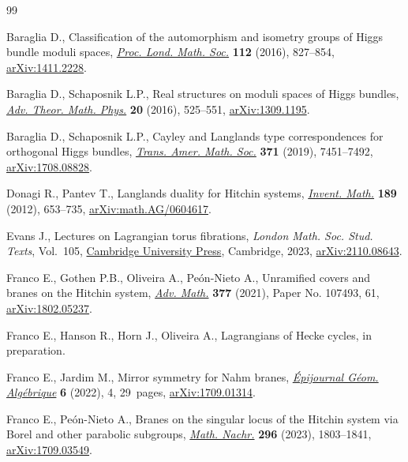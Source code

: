 \documentclass[pdftex]{sigma}
\numberwithin{equation}{section}
\theoremstyle{definition}
\begin{document}
\begin{thebibliography}{99}
\footnotesize\itemsep=0pt

Baraglia D., Classification of the automorphism and isometry groups of {H}iggs
 bundle moduli spaces,
 \href{https://doi.org/10.1112/plms/pdw014}{\textit{Proc. Lond. Math. Soc.}}
 \textbf{112} (2016), 827--854,
 \href{http://arxiv.org/abs/1411.2228}{arXiv:1411.2228}.

Baraglia D., Schaposnik L.P., Real structures on moduli spaces of {H}iggs
 bundles, \href{https://doi.org/10.4310/ATMP.2016.v20.n3.a2}{\textit{Adv.
 Theor. Math. Phys.}} \textbf{20} (2016), 525--551,
 \href{http://arxiv.org/abs/1309.1195}{arXiv:1309.1195}.

Baraglia D., Schaposnik L.P., Cayley and {L}anglands type correspondences for
 orthogonal {H}iggs bundles,
 \href{https://doi.org/10.1090/tran/7587}{\textit{Trans. Amer. Math. Soc.}}
 \textbf{371} (2019), 7451--7492,
 \href{http://arxiv.org/abs/1708.08828}{arXiv:1708.08828}.

Donagi R., Pantev T., Langlands duality for {H}itchin systems,
 \href{https://doi.org/10.1007/s00222-012-0373-8}{\textit{Invent. Math.}}
 \textbf{189} (2012), 653--735,
 \href{http://arxiv.org/abs/math.AG/0604617}{arXiv:math.AG/0604617}.

Evans J., Lectures on {L}agrangian torus fibrations, \textit{London Math. Soc.
 Stud. Texts}, Vol.~105,
 \href{https://doi.org/10.1017/9781009372671}{Cambridge University Press},
 Cambridge, 2023, \href{http://arxiv.org/abs/2110.08643}{arXiv:2110.08643}.

Franco E., Gothen P.B., Oliveira A., Pe\'{o}n-Nieto A., Unramified covers and
 branes on the {H}itchin system,
 \href{https://doi.org/10.1016/j.aim.2020.107493}{\textit{Adv. Math.}}
 \textbf{377} (2021), Paper No. 107493, 61,
 \href{http://arxiv.org/abs/1802.05237}{arXiv:1802.05237}.

Franco E., Hanson R., Horn J., Oliveira A., Lagrangians of Hecke cycles, {i}n
 preparation.

Franco E., Jardim M., Mirror symmetry for {N}ahm branes,
 \href{https://doi.org/10.46298/epiga.2022.6604}{\textit{\'{E}pijournal
 G\'{e}om. Alg\'{e}brique}} \textbf{6} (2022), 4, 29~pages,
 \href{http://arxiv.org/abs/1709.01314}{arXiv:1709.01314}.

Franco E., Pe\'{o}n-Nieto A., Branes on the singular locus of the {H}itchin
 system via {B}orel and other parabolic subgroups,
 \href{https://doi.org/10.1002/mana.202000267}{\textit{Math. Nachr.}}
 \textbf{296} (2023), 1803--1841,
 \href{http://arxiv.org/abs/1709.03549}{arXiv:1709.03549}.


\end{thebibliography}
\end{document}
